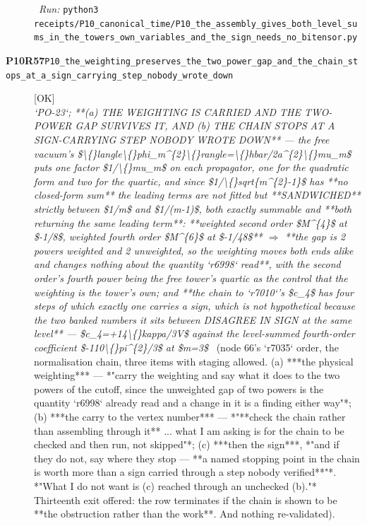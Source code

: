 \begin{description}
\ \emph{Run:} \texttt{python3 receipts/P10\_canonical\_time/P10\_the\_assembly\_gives\_both\_level\_sums\_in\_the\_towers\_own\_variables\_and\_the\_sign\_needs\_no\_bitensor.py}
\item[\rcptlabel{P10_the_weighting_preserves_the_two_power_gap_and_the_chain_stops_at_a_sign_carrying_step_nobody_wrote_down}{P10R57}\textbf{P10R57}\quad\texttt{P10\_the\_weighting\_preserves\_the\_two\_power\_gap\_and\_the\_chain\_stops\_at\_a\_sign\_carrying\_step\_nobody\_wrote\_down}]\hfill\textsf{[OK]}\\
\textit{`PO-23`;  **(a) THE WEIGHTING IS CARRIED AND THE TWO-POWER GAP SURVIVES IT, AND (b) THE CHAIN STOPS AT A SIGN-CARRYING STEP NOBODY WROTE DOWN** --- the free vacuum's \$\textbackslash\{\}langle\textbackslash\{\}phi\_m\textasciicircum{}\{2\}\textbackslash\{\}rangle=\textbackslash\{\}hbar/2a\textasciicircum{}\{2\}\textbackslash\{\}mu\_m\$ puts one factor \$1/\textbackslash\{\}mu\_m\$ on each propagator, one for the quadratic form and two for the quartic, and since \$1/\textbackslash\{\}sqrt\{m\textasciicircum{}\{2\}-1\}\$ has **no closed-form sum** the leading terms are not fitted but **SANDWICHED** strictly between \$1/m\$ and \$1/(m-1)\$, both exactly summable and **both returning the same leading term**: **weighted second order \$M\textasciicircum{}\{4\}\$ at \$-1/8\$, weighted fourth order \$M\textasciicircum{}\{6\}\$ at \$-1/48\$** \ensuremath{\Rightarrow} **the gap is 2 powers weighted and 2 unweighted, so the weighting moves both ends alike and changes nothing about the quantity `r6998` read**, with the second order's fourth power being the free tower's quartic as the control that the weighting is the tower's own; and **the chain to `r7010`'s \$c\_4\$ has four steps of which exactly one carries a sign, which is not hypothetical because the two banked numbers it sits between DISAGREE IN SIGN at the same level** --- \$c\_4=+14\textbackslash\{\}kappa/3V\$ against the level-summed fourth-order coefficient \$-110\textbackslash\{\}pi\textasciicircum{}\{2\}/3\$ at \$m=3\$} \ (node 66's `r7035` order, the normalisation chain, three items with staging allowed. (a) ***the physical weighting*** --- *"carry the weighting and say what it does to the two powers of the cutoff, since the unweighted gap of two powers is the quantity `r6998` already read and a change in it is a finding either way"*; (b) ***the carry to the vertex number*** --- *"**check the chain rather than assembling through it** ... what I am asking is for the chain to be checked and then run, not skipped"*; (c) ***then the sign***, *"and if they do not, say where they stop --- **a named stopping point in the chain is worth more than a sign carried through a step nobody verified**"*.  *"What I do not want is (c) reached through an unchecked (b)."*  Thirteenth exit offered: the row terminates if the chain is shown to be **the obstruction rather than the work**.  And nothing re-validated). 

\end{description}
